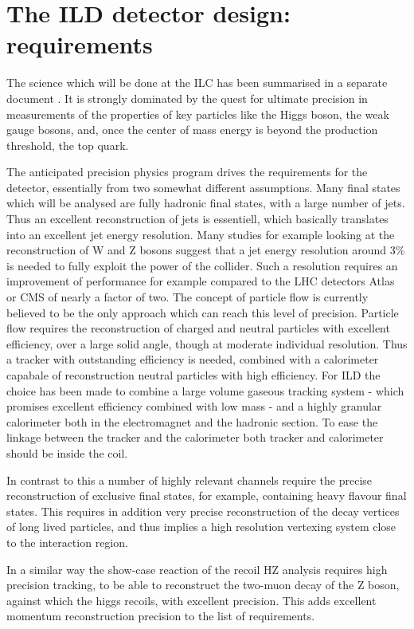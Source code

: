 \documentclass[%
 preprint,
 amsmath,amssymb,
 aps,
]{revtex4-1}
\begin{document}
\section{The ILD detector design: requirements}
The science which will be done at the ILC has been summarised in a separate document \cite{ILC-ESU1}. It is strongly dominated by the quest for ultimate precision in measurements of the properties of key particles like the Higgs boson, the weak gauge bosons, and, once the center of mass energy is beyond the production threshold, the top quark. 

The anticipated precision physics program drives the requirements for the detector, essentially from two somewhat different assumptions. Many final states which will be analysed are fully hadronic final states, with a large number of jets. Thus an excellent reconstruction of jets is essentiell, which basically translates into an excellent jet energy resolution. Many studies for example looking at the reconstruction of W and Z bosons suggest that a jet energy resolution around 3\% is needed to fully exploit the power of the collider. Such a resolution requires an improvement of performance for example compared to the LHC detectors Atlas or CMS of nearly a factor of two. The concept of particle flow is currently believed to be the only approach which can reach this level of precision. Particle flow requires the reconstruction of charged and neutral particles with excellent efficiency, over a large solid angle, though at moderate individual resolution. Thus a tracker with outstanding efficiency is needed, combined with a calorimeter capabale of reconstruction neutral particles with high efficiency. For ILD the choice has been made to combine a large volume gaseous tracking system - which promises excellent efficiency combined with low mass - and a highly granular calorimeter both in the electromagnet and the hadronic section. To ease the linkage between the tracker and the calorimeter both tracker and calorimeter should be inside the coil. 

In contrast to this a number of highly relevant channels require the precise reconstruction of exclusive final states, for example, containing heavy flavour final states. This requires in addition very precise reconstruction of the decay vertices of long lived particles, and thus implies a high resolution vertexing system close to the interaction region. 

In a similar way the show-case reaction of the recoil HZ analysis requires high precision tracking, to be able to reconstruct the two-muon decay of the Z boson, against which the higgs recoils, with excellent precision. This adds excellent momentum reconstruction precision to the list of requirements. 
\end{document}
